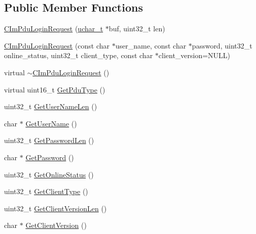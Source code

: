 \subsection*{Public Member Functions}
\begin{DoxyCompactItemize}
\item 
\hyperlink{class_c_im_pdu_login_request_aa1e9dc3b745fde7905fabbd749ab6f8b}{C\+Im\+Pdu\+Login\+Request} (\hyperlink{base_2ostype_8h_a124ea0f8f4a23a0a286b5582137f0b8d}{uchar\+\_\+t} $\ast$buf, uint32\+\_\+t len)
\item 
\hyperlink{class_c_im_pdu_login_request_aa901a5bd125da85e094e9081885413f1}{C\+Im\+Pdu\+Login\+Request} (const char $\ast$user\+\_\+name, const char $\ast$password, uint32\+\_\+t online\+\_\+status, uint32\+\_\+t client\+\_\+type, const char $\ast$client\+\_\+version=N\+U\+L\+L)
\item 
virtual \hyperlink{class_c_im_pdu_login_request_a3ce6cd83a753ef91d812001a2ae775e2}{$\sim$\+C\+Im\+Pdu\+Login\+Request} ()
\item 
virtual uint16\+\_\+t \hyperlink{class_c_im_pdu_login_request_af69739cb8426a4b15b748d9ef1edc71b}{Get\+Pdu\+Type} ()
\item 
uint32\+\_\+t \hyperlink{class_c_im_pdu_login_request_aff813934808575d67f1c13a1ad6ab37c}{Get\+User\+Name\+Len} ()
\item 
char $\ast$ \hyperlink{class_c_im_pdu_login_request_adae8752dbe063456782be770747f535e}{Get\+User\+Name} ()
\item 
uint32\+\_\+t \hyperlink{class_c_im_pdu_login_request_a6f0fe5c678851bfb4af9ee21bfb03d58}{Get\+Password\+Len} ()
\item 
char $\ast$ \hyperlink{class_c_im_pdu_login_request_a637b4f27c72daa0ab4065511b881535c}{Get\+Password} ()
\item 
uint32\+\_\+t \hyperlink{class_c_im_pdu_login_request_a960b8c84d01f94b3802d026283627c6f}{Get\+Online\+Status} ()
\item 
uint32\+\_\+t \hyperlink{class_c_im_pdu_login_request_ac1f51bafd457df40fc0b7517c3c5f4c7}{Get\+Client\+Type} ()
\item 
uint32\+\_\+t \hyperlink{class_c_im_pdu_login_request_a956cc292f321b11a9d56c106a87261c7}{Get\+Client\+Version\+Len} ()
\item 
char $\ast$ \hyperlink{class_c_im_pdu_login_request_a9e800931377579b91f16c47fe1646117}{Get\+Client\+Version} ()
\end{DoxyCompactItemize}

